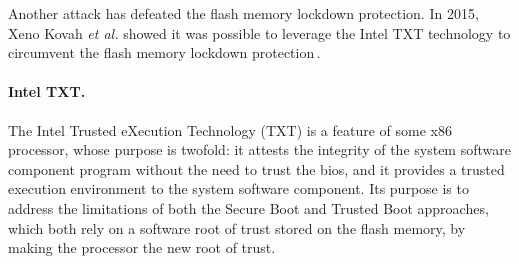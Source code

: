 Another attack has defeated the flash memory lockdown protection.
%
In 2015, Xeno Kovah \emph{et al.} showed it was possible to leverage the Intel
TXT technology to circumvent the flash memory lockdown
protection\,\cite{kovah2015senter}.

\paragraph{Intel TXT.}
%
The Intel Trusted eXecution Technology (TXT)\cite{intel2015txt} is a feature of
some x86 processor, whose purpose is twofold: it attests the integrity of the
system software component program without the need to trust the \ac{bios}, and
it provides a trusted execution environment to the system software component.
%
Its purpose is to address the limitations of both the Secure Boot and Trusted
Boot approaches, which both rely on a software root of trust stored on the flash
memory, by making the processor the new root of trust.
%

